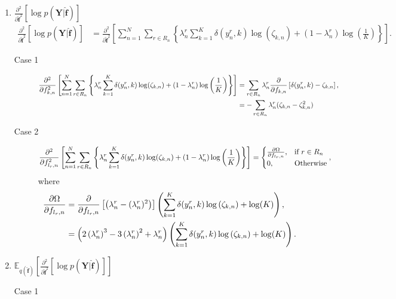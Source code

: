 \documentclass[9pt]{article}
\providecommand{\ve}[1]{{\bm{#1}}}%
\providecommand{\mat}[1]{{\bm{#1}}} %
\providecommand{\ve}[1]{{\mathbf{#1}}}
\providecommand{\mat}[1]{{\mathbf{#1}}}
\newcommand{\fracpartial}[2]{\frac{\partial #1}{\partial  #2}} %
\begin{document}
\begin{enumerate}
	\item $\fracpartial{^2}{\hat{\ve{f}}^2}\left[\log p(\mat{Y}|\hat{\ve{f}})\right]$
	\begin{align}
	\fracpartial{^2}{\hat{\ve{f}}^2}\left[\log p(\mat{Y}|\hat{\ve{f}})\right]&= \fracpartial{^2}{\hat{\ve{f}}^2}\left[\sum^N_{n=1}\sum_{r\in R_n}\left\{{\lambda}_n^r\sum_{k=1}^{K}\delta(y_n^r,k)\log(\zeta_{k,n}) + (1- {\lambda}_n^r) \log\left(\frac{1}{K}\right)\right\}\right].
	\end{align}
	\begin{description}
		\item[Case 1]
		\begin{align}
		\notag\fracpartial{^2}{f_{k,n}^2}\left[\sum^N_{n=1}\sum_{r\in R_n}\left\{{\lambda}_n^r\sum_{k=1}^{K}\delta(y_n^r,k)\log(\zeta_{k,n}) + (1- {\lambda}_n^r)\log\left(\frac{1}{K}\right)\right\}\right] &=\sum_{r\in R_n}{\lambda}_n^r \fracpartial{}{f_{k,n}}\left[\delta(y_n^r,k)-\zeta_{k,n}\right],\\
		&=-\sum_{r\in R_n}{\lambda}_n^r(\zeta_{k,n} - \zeta_{k,n}^2)
		\end{align}
		\item[Case 2]
		\begin{align}
		\notag&\fracpartial{^2}{f_{l_r,n}^2}\left[\sum^N_{n=1}\sum_{r\in R_n}\left\{{\lambda}_n^r \sum_{k=1}^{K}\delta(y_n^r,k)\log(\zeta_{k,n}) + (1- {\lambda}_n^r) \log\left(\frac{1}{K}\right)\right\}\right] = \begin{cases}
		\fracpartial{\Omega}{f_{l_r,n}}, & \mbox{if $r\in R_n$} \\
		0,& \mbox{Otherwise}
		\end{cases},
		\end{align}
		where
		\begin{align}
		\notag\fracpartial{\Omega}{f_{l_r,n}} &= \fracpartial{}{f_{l_r,n}}\left[\left({\lambda}_n^r - ({\lambda}_n^r)^2\right)\right]\left(\sum_{k=1}^{K}\delta(y_n^r,k)\log\left(\zeta_{k,n}\right) + \log(K) \right),\\
		&= \left(2\left({\lambda}_n^r\right)^3 - 3\left({\lambda}_n^r\right)^2 + {\lambda}_n^r\right)\left(\sum_{k=1}^{K}\delta(y_n^r,k)\log\left(\zeta_{k,n}\right) + \log(K) \right).
		\end{align}
	\end{description}
	\item $\mathbb{E}_{q(\hat{\ve{f}})}\left[\fracpartial{^2}{\hat{\ve{f}}^2}\left[\log p(\mat{Y}|\hat{\ve{f}})\right]\right]$
	\begin{description}
		\item[Case 1] 

\end{description}
\end{enumerate}
\end{document}
